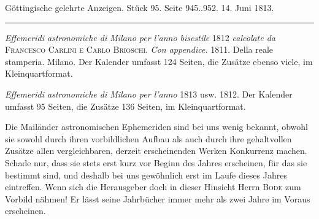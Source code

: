 \clearpage
{}
\begin{center}\small Göttingische gelehrte Anzeigen. Stück 95. Seite 945..952. 14. Juni 1813.\\[3pt]\rule{.72\linewidth}{.3pt}\end{center}

\emph{Effemeridi astronomiche di Milano per l'anno bisestile} 1812 \emph{calcolate da} \textsc{Francesco Carlini e Carlo Brioschi}. \emph{Con appendice.} 1811. Della reale stamperia. Milano. Der Kalender umfasst 124 Seiten, die Zusätze ebenso viele, im Kleinquartformat.

\emph{Effemeridi astronomiche di Milano per l'anno} 1813 usw. 1812. Der Kalender umfasst 95 Seiten, die Zusätze 136 Seiten, im Kleinquartformat.

Die Mailänder astronomischen Ephemeriden sind bei uns wenig bekannt, obwohl sie sowohl durch ihren vorbildlichen Aufbau als auch durch ihre gehaltvollen Zusätze allen vergleichbaren, derzeit erscheinenden Werken Konkurrenz machen. Schade nur, dass sie stets erst kurz vor Beginn des Jahres erscheinen, für das sie bestimmt sind, und deshalb bei uns gewöhnlich erst im Laufe dieses Jahres eintreffen. Wenn sich die Herausgeber doch in dieser Hinsicht Herrn \textsc{Bode} zum Vorbild nähmen! Er lässt seine Jahrbücher immer mehr als zwei Jahre im Voraus erscheinen.

